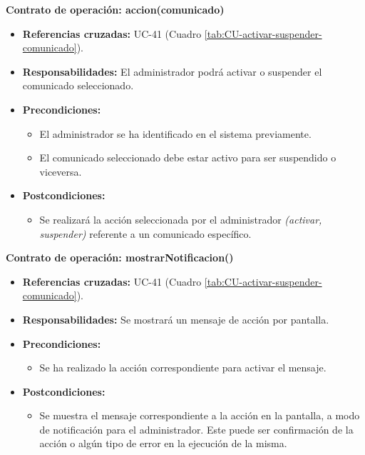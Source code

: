 \textbf{Contrato de operación: accion(comunicado)}
\begin{itemize}
\item \textbf{Referencias cruzadas:} UC-41 (Cuadro \ref{tab:CU-activar-suspender-comunicado}).
\item \textbf{Responsabilidades:} El administrador podrá activar o suspender el comunicado seleccionado.
\item \textbf{Precondiciones:} 
 \begin{itemize}
\item El administrador se ha identificado en el sistema previamente.
\item El comunicado seleccionado debe estar activo para ser suspendido o viceversa.
\end {itemize}
\item \textbf{Postcondiciones:} 
 \begin{itemize}
\item Se realizará la acción seleccionada por el administrador \textit{(activar, suspender)} referente a un comunicado específico.
\end {itemize}
\end {itemize}

\textbf{Contrato de operación: mostrarNotificacion()}
\begin{itemize}
\item \textbf{Referencias cruzadas:} UC-41 (Cuadro \ref{tab:CU-activar-suspender-comunicado}).
\item \textbf{Responsabilidades:} Se mostrará un mensaje de acción por pantalla.
\item \textbf{Precondiciones:} 
 \begin{itemize}
\item Se ha realizado la acción correspondiente para activar el mensaje.
\end {itemize}
\item \textbf{Postcondiciones:} 
 \begin{itemize}
\item Se muestra el mensaje correspondiente a la acción en la pantalla, a modo de notificación para el administrador. Este puede ser confirmación de la acción o algún tipo de error en la ejecución de la misma.
\end {itemize}
\end {itemize}


\vspace{10mm}

